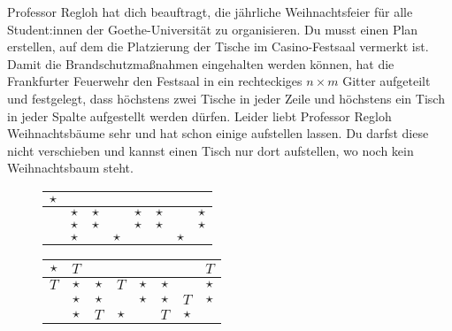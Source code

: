 \documentclass{uebung_cs}
\begin{document}
\newpage
\begin{exercise}[Weihnachtsbäume]
    Professor Regloh hat dich beauftragt, die jährliche Weihnachtsfeier für alle Student:innen der Goethe-Universität zu organisieren. Du musst einen Plan erstellen, auf dem die Platzierung der Tische im Casino-Festsaal vermerkt ist. Damit die Brandschutzmaßnahmen eingehalten werden können, hat die Frankfurter Feuerwehr den Festsaal in ein rechteckiges $n \times m$ Gitter aufgeteilt und festgelegt, dass höchstens zwei Tische in jeder Zeile und höchstens ein Tisch in jeder Spalte aufgestellt werden dürfen. Leider liebt Professor Regloh Weihnachtsbäume sehr und hat schon einige aufstellen lassen. Du darfst diese nicht verschieben und kannst einen Tisch nur dort aufstellen, wo noch kein Weihnachtsbaum steht.
    
    \begin{figure}[h]
    \centering
    \begin{minipage}{0.4\textwidth}
    	\begin{tabular}{|c|c|c|c|c|c|c|c|}
    		\hline 
			$\star$ &  &  &  &  &  &  &  \\ 
    		\hline 
	    	& $\star$ & $\star$ &  & $\star$ & $\star$ &  & $\star$ \\ 
	    	\hline 
		    & $\star$ & $\star$ &  & $\star$ & $\star$ &  & $\star$ \\ 
    		\hline 
		    & $\star$ &  & $\star$ &  &  & $\star$ &  \\ 
    		\hline 
    	\end{tabular}
    	\caption{\label{Ohne_Tische}}
    \end{minipage}
    \begin{minipage}{0.4\textwidth}
    	\begin{tabular}{|c|c|c|c|c|c|c|c|}
		    \hline 
    		$\star$ & $T$ &  &  &  &  &  & $T$ \\ 
	    	\hline 
	    	$T$ & $\star$ & $\star$ & $T$ & $\star$ & $\star$ &  & $\star$ \\ 
		    \hline 
    		& $\star$ & $\star$ &  & $\star$ & $\star$ & $T$ & $\star$ \\ 
		    \hline 
    		& $\star$ & $T$ & $\star$ &  & $T$ & $\star$ &  \\ 
	    	\hline 
    	\end{tabular}
    	\caption{\label{Mit Tischen}}
    \end{minipage}
    \end{figure}
     

\end{exercise}
\end{document}
